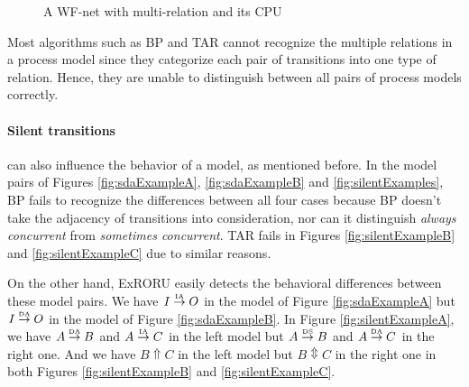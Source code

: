 \documentclass{llncs}
\begin{document}
\begin{figure}[htbp]
\centering
{}
\caption{A WF-net with multi-relation and its CPU\label{fig:exampleMultiRelation}}
\end{figure}

Most algorithms such as BP and TAR cannot recognize the multiple relations in a process model since they categorize each pair of transitions into one type of relation. Hence, they are unable to distinguish between all pairs of process models correctly.

\paragraph{\textbf{Silent transitions}} can also influence the behavior of a model, as mentioned before. In the model pairs of Figures \ref{fig:sdaExampleA}, \ref{fig:sdaExampleB} and \ref{fig:silentExamples}, BP fails to recognize the differences between all four cases because BP doesn't take the adjacency of transitions into consideration, nor can it distinguish \textit{always concurrent} from \textit{sometimes concurrent}. TAR fails in Figures \ref{fig:silentExampleB} and \ref{fig:silentExampleC} due to similar reasons.

On the other hand, ExRORU easily detects the behavioral differences between these model pairs. We have $I\overset{\text{\tiny{IA}}}{\rightarrow}O$ in the model of Figure \ref{fig:sdaExampleA} but $I\overset{\text{\tiny{DA}}}{\rightarrow}O$ in the model of Figure \ref{fig:sdaExampleB}. In Figure \ref{fig:silentExampleA}, we have $A\overset{\text{\tiny{DA}}}{\rightarrow}B$ and $A\overset{\text{\tiny{IA}}}{\rightarrow}C$ in the left model but $A\overset{\text{\tiny{DS}}}{\rightarrow}B$ and $A\overset{\text{\tiny{DA}}}{\rightarrow}C$ in the right one. And we have $B\Uparrow C$ in the left model but $B\Updownarrow C$ in the right one in both Figures \ref{fig:silentExampleB} and \ref{fig:silentExampleC}.
\end{document}
